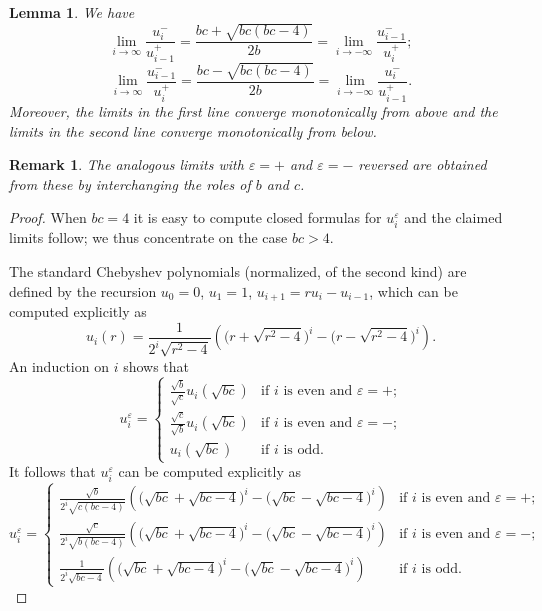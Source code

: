 \documentclass{amsart}
\newtheorem{lemma}[theorem]{Lemma}
\newtheorem{remark}[theorem]{Remark}
\numberwithin{theorem}{section}
\begin{document}
  \begin{lemma}
    \label{le:limits}
    We have
    \[\lim_{i\to\infty} \frac{u_i^-}{u_{i-1}^+}=\frac{bc+\sqrt{bc(bc-4)}}{2b}=\lim_{i\to-\infty} \frac{u_{i-1}^-}{u_i^+};\]
    \[\lim_{i\to\infty} \frac{u_{i-1}^-}{u_i^+}=\frac{bc-\sqrt{bc(bc-4)}}{2b}=\lim_{i\to-\infty} \frac{u_i^-}{u_{i-1}^+}.\]
    Moreover, the limits in the first line converge monotonically from above and the limits in the second line converge monotonically from below.
  \end{lemma}
  \begin{remark}
    The analogous limits with $\varepsilon=+$ and $\varepsilon=-$ reversed are obtained from these by interchanging the roles of $b$ and $c$.
  \end{remark}
  \begin{proof}
    When $bc=4$ it is easy to compute closed formulas for $u_i^\varepsilon$ and the claimed limits follow; we thus concentrate on the case $bc>4$.

    The standard Chebyshev polynomials (normalized, of the second kind) are defined by the recursion $u_0=0$, $u_1=1$, $u_{i+1}=ru_i-u_{i-1}$, which can be computed explicitly as
    \[u_i(r)=\frac{1}{2^i\sqrt{r^2-4}}\left(\big(r+\sqrt{r^2-4}\big)^i-\big(r-\sqrt{r^2-4}\big)^i\right).\]
    An induction on $i$ shows that 
    \[u_i^\varepsilon=\begin{cases} \frac{\sqrt{b}}{\sqrt{c}}u_i(\sqrt{bc}) & \text{if $i$ is even and $\varepsilon=+$;}\\ \frac{\sqrt{c}}{\sqrt{b}}u_i(\sqrt{bc}) & \text{if $i$ is even and $\varepsilon=-$;}\\ u_i(\sqrt{bc}) & \text{if $i$ is odd.} \end{cases}\]
    It follows that $u_i^\varepsilon$ can be computed explicitly as
    \[u_i^\varepsilon=\begin{cases} \frac{\sqrt{b}}{2^i\sqrt{c(bc-4)}}\left(\big(\sqrt{bc}+\sqrt{bc-4}\big)^i-\big(\sqrt{bc}-\sqrt{bc-4}\big)^i\right) & \text{if $i$ is even and $\varepsilon=+$;}\\ \frac{\sqrt{c}}{2^i\sqrt{b(bc-4)}}\left(\big(\sqrt{bc}+\sqrt{bc-4}\big)^i-\big(\sqrt{bc}-\sqrt{bc-4}\big)^i\right) & \text{if $i$ is even and $\varepsilon=-$;}\\ \frac{1}{2^i\sqrt{bc-4}}\left(\big(\sqrt{bc}+\sqrt{bc-4}\big)^i-\big(\sqrt{bc}-\sqrt{bc-4}\big)^i\right) & \text{if $i$ is odd.} \end{cases}\]


\end{proof}
\end{document}
